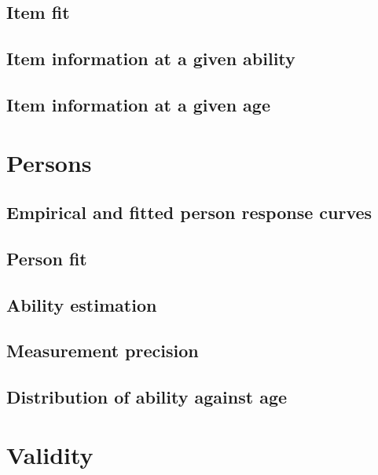 \documentclass[]{book}
\begin{document}
\section{Item fit}\label{item-fit}

\section{Item information at a given
ability}\label{item-information-at-a-given-ability}

\section{Item information at a given
age}\label{item-information-at-a-given-age}

\chapter{Persons}\label{persons}

\section{Empirical and fitted person response
curves}\label{empirical-and-fitted-person-response-curves}

\section{Person fit}\label{person-fit}

\section{Ability estimation}\label{ability-estimation}

\section{Measurement precision}\label{measurement-precision}

\section{Distribution of ability against
age}\label{distribution-of-ability-against-age}

\chapter{Validity}\label{validity}
\end{document}
